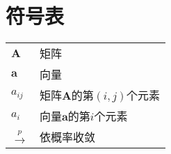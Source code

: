 \chapter{符\quad 号\quad 表} \label{chap:notions}

\begin{center}
 \begin{tabular}{ll}
	$\bm A$ &矩阵\\
	$\bm a$ & 向量\\
	$a_{ij}$ & 矩阵$\bm{A}$的第$(i,j)$个元素 \\
	$a_{i}$ & 向量$\bm{a}$的第$i$个元素 \\
	\(\stackrel{p}{\longrightarrow}\) & 依概率收敛\\
\end{tabular}   
\end{center}
